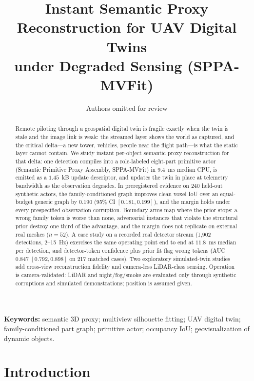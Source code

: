 \documentclass[11pt,a4paper]{article}
\title{Instant Semantic Proxy Reconstruction for UAV Digital Twins\\
under Degraded Sensing (SPPA-MVFit)}
\author{Authors omitted for review}
\date{}
\begin{document}
\maketitle

\begin{abstract}
Remote piloting through a geospatial digital twin is fragile exactly when
the twin is stale and the image link is weak: the streamed layer shows the
world as captured, and the critical delta---a new tower,
vehicles, people near the flight path---is what the static layer cannot
contain. We study instant per-object semantic proxy reconstruction for that
delta: one detection compiles into a role-labeled eight-part primitive actor
(Semantic Primitive Proxy Assembly, SPPA-MVFit) in \(9.4\)~ms median CPU, is
emitted as a \(1.45\)~kB update descriptor, and updates the twin in place at
telemetry bandwidth as the observation degrades. In preregistered evidence on
240 held-out synthetic
actors, the family-conditioned graph improves
clean voxel IoU over an equal-budget generic graph by \(0.190\) (95\% CI
\([0.181,0.199]\)), and the margin holds under every prespecified
observation corruption. Boundary arms map where the prior stops: a
wrong family token is worse than none, adversarial instances that violate
the structural prior destroy one third of the advantage, and the margin
does not replicate on external real meshes (\(n{=}52\)). A case study on
a recorded real detector stream (1{,}902 detections, 2--15~Hz) exercises
the same operating point end to end at \(11.8\)~ms median per detection,
and detector-token confidence plus prior fit flag wrong tokens (AUC
\(0.847\) \([0.792,0.898]\) on 217 matched cases). Two exploratory
simulated-twin studies add cross-view reconstruction fidelity and
camera-less LiDAR-class sensing. Operation is
camera-validated: LiDAR and night/fog/smoke are evaluated only through
synthetic corruptions and simulated demonstrations; position is assumed
given.
\end{abstract}

\noindent\textbf{Keywords:} semantic 3D proxy; multiview silhouette fitting;
UAV digital twin; family-conditioned part graph; primitive actor; occupancy IoU;
geovisualization of dynamic objects.

\section{Introduction}
\end{document}
